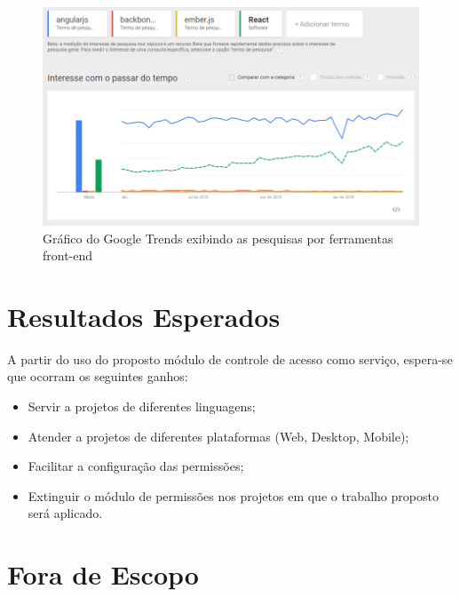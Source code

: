 \begin{figure} %
	\includegraphics[width=1\textwidth]{images/grafico_ferramentas_front}
	\caption{Gráfico do Google Trends exibindo as pesquisas por ferramentas front-end}
    \label{fig:graficoGoogleTrendsFerramentasFront}
\end{figure}


\section{Resultados Esperados}\label{resultados}


A partir do uso do proposto módulo de controle de acesso como serviço, espera-se que ocorram os seguintes ganhos:


\begin{itemize}
	\item Servir a projetos de diferentes linguagens;
	\item Atender a projetos de diferentes plataformas (Web, Desktop, Mobile);
	\item Facilitar a configuração das permissões;
	\item Extinguir o módulo de permissões nos projetos em que o trabalho proposto será aplicado.
\end{itemize}


\section{Fora de Escopo}\label{fora}


